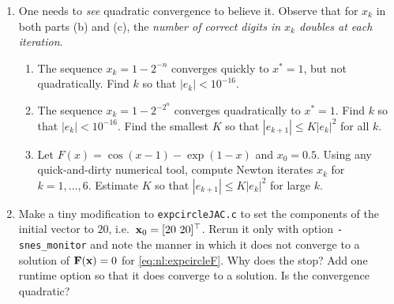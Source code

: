 \renewcommand{\labelenumi}{\arabic{chapter}.\arabic{enumi}\quad}
\renewcommand{\labelenumii}{(\alph{enumii})}
\begin{enumerate}
\item One needs to \emph{see} quadratic convergence to believe it.  Observe that for $x_k$ in both parts (b) and (c), the \emph{number of correct digits in $x_k$ doubles at each iteration}.
    \begin{enumerate}
    \item The sequence $x_k = 1-2^{-n}$ converges quickly to $x^*=1$, but not quadratically.  Find $k$ so that $|e_k| < 10^{-16}$.
    \item The sequence $x_k = 1-2^{-2^n}$ converges quadratically to $x^*=1$.  Find $k$ so that $|e_k| < 10^{-16}$.  Find the smallest $K$ so that $|e_{k+1}| \le K |e_k|^2$ for all $k$.
    \item Let $F(x) = \cos(x-1) - \exp(1-x)$ and $x_0=0.5$.  Using any quick-and-dirty numerical tool, compute Newton iterates $x_k$ for $k=1,\dots,6$.  Estimate $K$ so that $|e_{k+1}| \le K |e_k|^2$ for large $k$.
    \end{enumerate}

\item Make a tiny modification to \texttt{expcircleJAC.c} to set the components of the initial vector to $20$, i.e.~$\mathbf{x}_0 = [20\,\, 20]^\top$.  Rerun it only with option \texttt{-snes\_monitor} and note the manner in which it does not converge to a solution of $\mathbf{F}(\mathbf{x})=0$ for \eqref{eq:nl:expcircleF}.  Why does the \pSNES stop?  Add one runtime option so that it does converge to a solution.  Is the convergence quadratic?


\end{enumerate}
